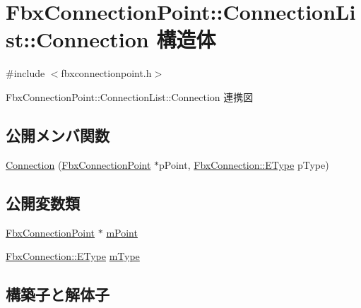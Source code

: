\hypertarget{struct_fbx_connection_point_1_1_connection_list_1_1_connection}{}\section{Fbx\+Connection\+Point\+:\+:Connection\+List\+:\+:Connection 構造体}
\label{struct_fbx_connection_point_1_1_connection_list_1_1_connection}


{\ttfamily \#include $<$fbxconnectionpoint.\+h$>$}



Fbx\+Connection\+Point\+:\+:Connection\+List\+:\+:Connection 連携図
\subsection*{公開メンバ関数}
\begin{DoxyCompactItemize}
\item 
\hyperlink{struct_fbx_connection_point_1_1_connection_list_1_1_connection_a1c29fc410e48b4e3d51d918b04c03dd9}{Connection} (\hyperlink{class_fbx_connection_point}{Fbx\+Connection\+Point} $\ast$p\+Point, \hyperlink{class_fbx_connection_a3df448a5db356652ab99fd2be2553749}{Fbx\+Connection\+::\+E\+Type} p\+Type)
\end{DoxyCompactItemize}
\subsection*{公開変数類}
\begin{DoxyCompactItemize}
\item 
\hyperlink{class_fbx_connection_point}{Fbx\+Connection\+Point} $\ast$ \hyperlink{struct_fbx_connection_point_1_1_connection_list_1_1_connection_afcd68ab69315b9c919b4a2104d28eeaa}{m\+Point}
\item 
\hyperlink{class_fbx_connection_a3df448a5db356652ab99fd2be2553749}{Fbx\+Connection\+::\+E\+Type} \hyperlink{struct_fbx_connection_point_1_1_connection_list_1_1_connection_ad3018de581c15cd5cf4e85c2a87b9d6b}{m\+Type}
\end{DoxyCompactItemize}


\subsection{構築子と解体子}
\mbox{\label{struct_fbx_connection_point_1_1_connection_list_1_1_connection_a1c29fc410e48b4e3d51d918b04c03dd9}} 

